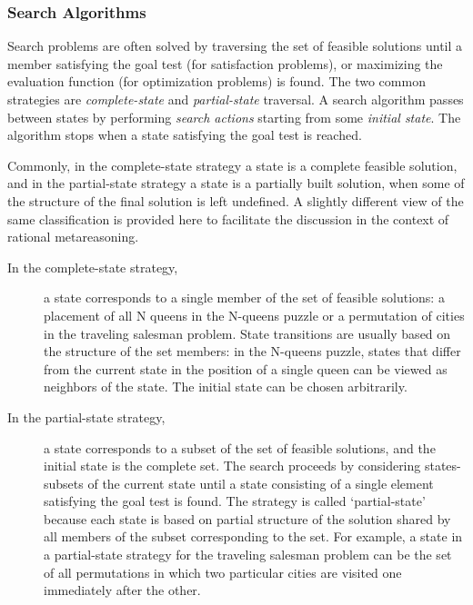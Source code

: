 \subsubsection{Search Algorithms}

Search problems are often solved by traversing the set of
feasible solutions until a member satisfying the goal test (for
satisfaction problems), or maximizing the evaluation function (for
optimization problems) is found. The two common strategies
are {\em complete-state} and {\em partial-state} traversal. A search
algorithm passes between states by performing {\em search actions}
starting from some {\em initial state}. The algorithm stops when a
state satisfying the goal test is reached.

Commonly, in the complete-state strategy a state is a complete
feasible solution, and in the partial-state strategy a state is a
partially built solution, when some of the structure of the final
solution is left undefined. A slightly different view of the same
classification is provided here to facilitate the discussion in the
context of rational metareasoning.

\begin{description}
\item[In the complete-state strategy,] a state corresponds to a single
  member of the set of feasible solutions: a  placement
  of all N queens in the N-queens puzzle or a permutation of cities in the
  traveling salesman problem. State transitions are usually based on
  the structure of the set members: in the N-queens puzzle, states
  that differ from the current state in the position of a single queen can
  be viewed as neighbors of the state. The initial state can be
  chosen arbitrarily.

\item[In the partial-state strategy,] a state corresponds to a subset
  of the set of feasible solutions, and the initial state is the
 complete set. The search proceeds by considering states-subsets of
  the current state until a state consisting of a single element
  satisfying the goal test is found. The strategy is called
  `partial-state' because each state is based on partial structure of
  the solution shared by all members of the subset corresponding to
  the set. For example, a state in a partial-state strategy for the
  traveling salesman problem can be the set of all permutations in
  which two particular cities are visited one immediately after the
  other.
\end{description}

